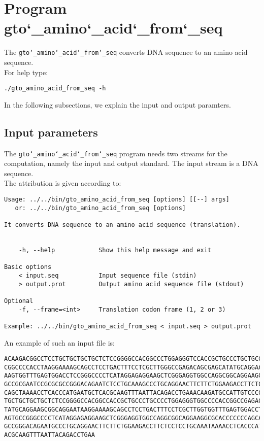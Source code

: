 \section{Program gto\char`_amino\char`_acid\char`_from\char`_seq}
The \texttt{gto\char`_amino\char`_acid\char`_from\char`_seq} converts DNA sequence to an amino acid sequence.\\
For help type:
\begin{lstlisting}
./gto_amino_acid_from_seq -h
\end{lstlisting}
In the following subsections, we explain the input and output paramters.

\subsection*{Input parameters}

The \texttt{gto\char`_amino\char`_acid\char`_from\char`_seq} program needs two streams for the computation, namely the input and output standard. The input stream is a DNA sequence.\\
The attribution is given according to:
\begin{lstlisting}
Usage: ../../bin/gto_amino_acid_from_seq [options] [[--] args]
   or: ../../bin/gto_amino_acid_from_seq [options]

It converts DNA sequence to an amino acid sequence (translation).


    -h, --help            Show this help message and exit

Basic options
    < input.seq           Input sequence file (stdin)
    > output.prot         Output amino acid sequence file (stdout)

Optional
    -f, --frame=<int>     Translation codon frame (1, 2 or 3)

Example: ../../bin/gto_amino_acid_from_seq < input.seq > output.prot
\end{lstlisting}
An example of such an input file is:
\begin{lstlisting}
ACAAGACGGCCTCCTGCTGCTGCTGCTCTCCGGGGCCACGGCCCTGGAGGGTCCACCGCTGCCCTGCTGCCATTGTCCC
CGGCCCCACCTAAGGAAAAGCAGCCTCCTGACTTTCCTCGCTTGGGCCGAGACAGCGAGCATATGCAGGAAGCGGCAGG
AAGTGGTTTGAGTGGACCTCCGGGCCCCTCATAGGAGAGGAAGCTCGGGAGGTGGCCAGGCGGCAGGAAGCAGGCCAGT
GCCGCGAATCCGCGCGCCGGGACAGAATCTCCTGCAAAGCCCTGCAGGAACTTCTTCTGGAAGACCTTCTCCACCCCCC
CAGCTAAAACCTCACCCATGAATGCTCACGCAAGTTTAATTACAGACCTGAAACAAGATGCCATTGTCCCCCGGCCTCC
TGCTGCTGCTGCTCTCCGGGGCCACGGCCACCGCTGCCCTGCCCCTGGAGGGTGGCCCCACCGGCCGAGACAGCGAGCA
TATGCAGGAAGCGGCAGGAATAAGGAAAAGCAGCCTCCTGACTTTCCTCGCTTGGTGGTTTGAGTGGACCTCCCAGGCC
AGTGCCGGGCCCCTCATAGGAGAGGAAGCTCGGGAGGTGGCCAGGCGGCAGGAAGGCGCACCCCCCCAGCAATCCGCGC
GCCGGGACAGAATGCCCTGCAGGAACTTCTTCTGGAAGACCTTCTCCTCCTGCAAATAAAACCTCACCCATGAATGCTC
ACGCAAGTTTAATTACAGACCTGAA
\end{lstlisting}

